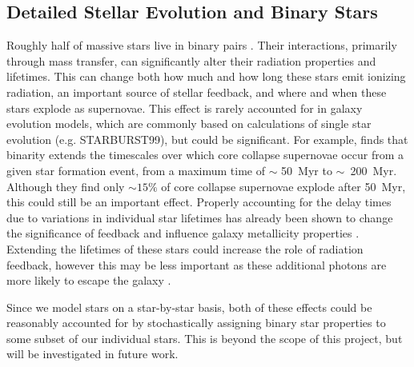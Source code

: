 \documentclass[twocolumn]{aastex61}
\begin{document}
\subsection{Detailed Stellar Evolution and Binary Stars}
\label{sec:binary stars}

Roughly half of massive stars live in binary pairs 
   \citep{Sana2012}. 
Their interactions, primarily through mass transfer, can significantly alter their radiation properties and lifetimes. This can change both how much and how long these stars emit ionizing radiation, an important source of stellar feedback, and where and when these stars explode as supernovae. This effect is rarely accounted for in galaxy evolution models, which are commonly based on calculations of single star evolution (e.g. STARBURST99), but could be significant. For example, \citet{Zapartas2017} finds that binarity extends the timescales over which core collapse supernovae occur from a given star formation event, from a maximum time of $\sim$ 50~Myr to $\sim$~200~Myr. Although they find only $\sim 15\%$ of core collapse supernovae explode after 50~Myr, this could still be an important effect. Properly accounting for the delay times due to variations in individual star lifetimes has already been shown to change the significance of feedback and influence galaxy metallicity properties \citep{Kimm2015}. Extending the lifetimes of these stars could increase the role of radiation feedback, however this may be less important as these additional photons are more likely to escape the galaxy \citep[e.g.][]{Ma2016-binary}. 

Since we model stars on a star-by-star basis, both of these effects could be reasonably accounted for by stochastically assigning binary star properties to some subset of our individual stars. This is beyond the scope of this project, but will be investigated in future work.
\end{document}
